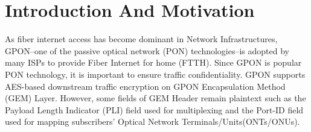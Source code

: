 \documentclass[conference]{IEEEtran}
\begin{document}
\maketitle

\begin{abstract}
Gigabit Passive Optical Networks (GPON), an ITU-T standardized technology widely adopted in fiber-to-the-home (FTTH) networks, supports downstream payload encryption to protect subscribers' traffic. Unfortunately, encryption does not cover all access-layer metadata. This poster presents a preliminary analysis showing that the Payload Length Indicator (PLI), which remains in plaintext in GEM headers, forms a side channel that enables inference of streaming activity. Using a GPON downstream simulator and controlled runs of youtube streaming, our preliminary results show that PLI traces are highly consistent across repeated runs of the same video and suggest that a passive attacker on the same optical splitter as the victim could potentially infer a victim's streaming activity (e.g., Youtube Video Identification). 
\end{abstract}






%
\IEEEpeerreviewmaketitle



\section{Introduction And Motivation}
As fiber internet access has become dominant in Network Infrastructures, GPON--one of the passive optical network (PON) technologies--is adopted by many ISPs to provide Fiber Internet for home (FTTH). Since GPON is popular PON technology, it is important to ensure traffic confidentiality. 
 GPON supports AES-based downstream traffic encryption on  GPON Encapsulation Method (GEM) Layer. However, some fields of GEM Header remain plaintext such as the Payload Length Indicator (PLI) field used for multiplexing and the Port-ID field used for mapping subscribers' Optical Network Terminals/Units(ONTs/ONUs).
\end{document}
